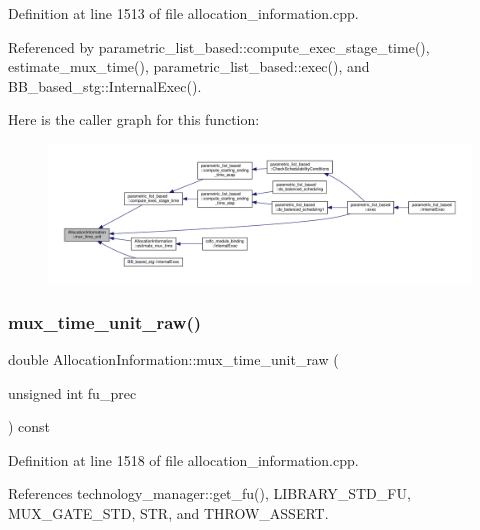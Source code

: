 Definition at line 1513 of file allocation\+\_\+information.\+cpp.



Referenced by parametric\+\_\+list\+\_\+based\+::compute\+\_\+exec\+\_\+stage\+\_\+time(), estimate\+\_\+mux\+\_\+time(), parametric\+\_\+list\+\_\+based\+::exec(), and B\+B\+\_\+based\+\_\+stg\+::\+Internal\+Exec().

Here is the caller graph for this function\+:
\nopagebreak
\begin{figure}[H]
\begin{center}
\leavevmode
\includegraphics[width=350pt]{d7/d79/classAllocationInformation_a5b11be86fb9ed67e286c657e18a9163a_icgraph}
\end{center}
\end{figure}
\mbox{\label{classAllocationInformation_adb31336cd112e8a0619fc8d26743bb0b}} 
\subsubsection{\texorpdfstring{mux\+\_\+time\+\_\+unit\+\_\+raw()}{mux\_time\_unit\_raw()}}
{\footnotesize\ttfamily double Allocation\+Information\+::mux\+\_\+time\+\_\+unit\+\_\+raw (\begin{DoxyParamCaption}\item[{unsigned int}]{fu\+\_\+prec }\end{DoxyParamCaption}) const}



Definition at line 1518 of file allocation\+\_\+information.\+cpp.



References technology\+\_\+manager\+::get\+\_\+fu(), L\+I\+B\+R\+A\+R\+Y\+\_\+\+S\+T\+D\+\_\+\+FU, M\+U\+X\+\_\+\+G\+A\+T\+E\+\_\+\+S\+TD, S\+TR, and T\+H\+R\+O\+W\+\_\+\+A\+S\+S\+E\+RT.



